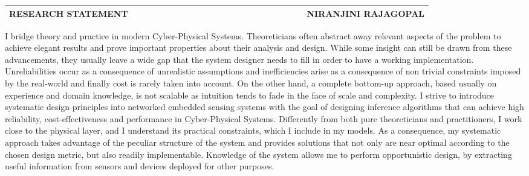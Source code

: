 \documentclass[10pt]{article}
\date{}
\begin{document}


\begin{table}
\color{blue}
\begin{tabular*}{\textwidth}{l r}
\large\textbf{RESEARCH STATEMENT} & 
\hfill \ \ \ \ \ \ \ \ \ \ \ \ \ \ \ \ \ \ \ \
\ \ \ \ \ \ \ \ \ \ \ \ \ \ \
\large\textbf{NIRANJINI RAJAGOPAL}\\
\hline
\end{tabular*}

\end{table}
 

I bridge theory and practice in modern Cyber-Physical Systems. %
Theoreticians often abstract away relevant aspects of the problem to achieve elegant results and prove important properties about their analysis and design. While some insight can still be drawn from these advancements, they usually leave a wide gap that the system designer needs to fill in order to have a working implementation. Unreliabilities occur as a consequence of unrealistic assumptions and inefficiencies arise as a consequence of non trivial constraints imposed by the real-world and finally cost is rarely taken into account. On the other hand, a complete bottom-up approach, based usually on experience and domain knowledge, is not scalable as intuition tends to fade in the face of scale and complexity. I strive to introduce systematic design principles into networked embedded sensing systems with the goal of designing inference algorithms that can achieve high reliability, cost-effectiveness and performance in Cyber-Physical Systems. Differently from both pure theoreticians and practitioners, I work close to the physical layer, and I understand its practical constraints, which I include in my models. As a consequence, my systematic approach takes advantage of the peculiar structure of the system and provides solutions that not only are near optimal according to the chosen design metric, but also readily implementable. Knowledge of the system allows me to perform opportunistic design, by extracting useful information from sensors and devices deployed for other purposes. \\
\end{document}
